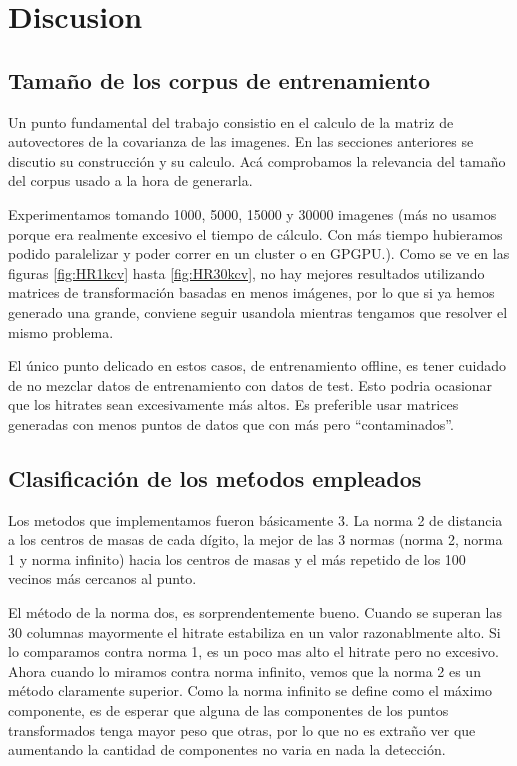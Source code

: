 \section{Discusion}

\subsection{Tama\~no de los corpus de entrenamiento }
Un punto fundamental del trabajo consistio en el calculo de la matriz de autovectores
de la covarianza de las imagenes. En las secciones anteriores se discutio su construcci\'on
y su calculo. Ac\'a comprobamos la relevancia del tama\~no del corpus usado a la hora
de generarla.

Experimentamos tomando 1000, 5000, 15000 y 30000 imagenes (m\'as no usamos porque era
realmente excesivo el tiempo de c\'alculo. Con m\'as tiempo hubieramos podido paralelizar
y poder correr en un cluster o en GPGPU.). Como se ve en las figuras \ref{fig:HR1kcv} hasta \ref{fig:HR30kcv},
no hay mejores resultados utilizando matrices de transformaci\'on basadas en menos im\'agenes, por lo que
si ya hemos generado una grande, conviene seguir usandola mientras tengamos que resolver
el mismo problema.

El \'unico punto delicado en estos casos, de entrenamiento offline, es tener cuidado
de no mezclar datos de entrenamiento con datos de test. Esto podria ocasionar que
los hitrates sean excesivamente m\'as altos. Es preferible usar matrices generadas
con menos puntos de datos que con m\'as pero ``contaminados''.


\subsection{Clasificaci\'on de los me\'todos empleados}
Los metodos que implementamos fueron b\'asicamente 3. La norma 2 de distancia a
los centros de masas de cada d\'igito, la mejor de las 3 normas (norma 2, norma 1 y norma infinito)
hacia los centros de masas y el m\'as repetido de los 100 vecinos m\'as cercanos al punto.

El m\'etodo de la norma dos, es sorprendentemente bueno. Cuando se superan las 30
columnas mayormente el hitrate estabiliza en un valor razonablmente alto. Si lo
comparamos contra norma 1, es un poco mas alto el hitrate pero no excesivo. Ahora
cuando lo miramos contra norma infinito, vemos que la norma 2 es un m\'etodo
claramente superior. Como la norma infinito se define como el m\'aximo componente,
es de esperar que alguna de las componentes de los puntos transformados tenga mayor
peso que otras, por lo que no es extra\~no ver que aumentando la cantidad de componentes
no varia en nada la detecci\'on.

